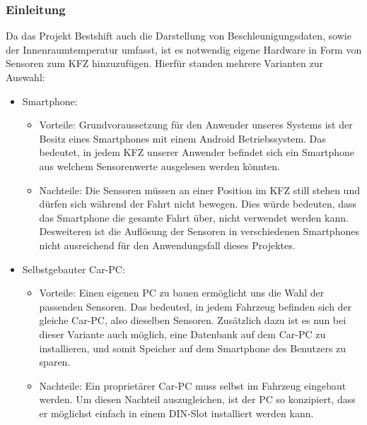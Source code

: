 \subsubsection{Einleitung}
\label{subsec:Einleitung}

Da das Projekt Bestshift auch die Darstellung von Beschleunigungsdaten, sowie der Innenraumtemperatur umfasst, ist es notwendig eigene Hardware in Form von Sensoren zum KFZ hinzuzufügen.
Hierfür standen mehrere Varianten zur Auswahl:

\begin{itemize}
	\item Smartphone:
	\begin{itemize}
	\item Vorteile: \nextline
	Grundvoraussetzung für den Anwender unseres Systems ist der Besitz eines Smartphones mit einem Android Betriebssystem.
	Das bedeutet, in jedem KFZ unserer Anwender befindet sich ein Smartphone aus welchem Sensorenwerte ausgelesen werden könnten.
	\item Nachteile: \nextline
	Die Sensoren müssen an einer Position im KFZ still stehen und dürfen sich während der Fahrt nicht bewegen. Dies würde bedeuten, dass das Smartphone die gesamte Fahrt über, nicht verwendet werden kann.
\nextline
Desweiteren ist die Auflösung der Sensoren in verschiedenen Smartphones nicht ausreichend für den Anwendungsfall dieses Projektes.
	\end{itemize}
	\item Selbstgebauter Car-PC:
	\begin{itemize}
	\item Vorteile: \nextline
	Einen eigenen PC zu bauen ermöglicht uns die Wahl der passenden Sensoren. Das bedeuted, in jedem Fahrzeug befinden sich der gleiche Car-PC, also dieselben Sensoren.
	Zusätzlich dazu ist es nun bei dieser Variante auch möglich, eine Datenbank auf dem Car-PC zu installieren, und somit Speicher auf dem Smartphone des Benutzers zu sparen.
	\item Nachteile: \nextline
	Ein proprietärer Car-PC muss selbst im Fahrzeug eingebaut werden. Um diesen Nachteil auszugleichen, ist der PC so konzipiert, dass er möglichst einfach in einem DIN-Slot installiert werden kann.
	\end{itemize}
\end{itemize}